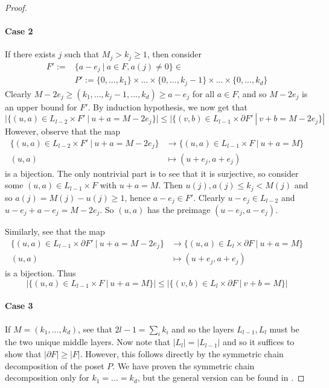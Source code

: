 \documentclass{scrartcl}
\theoremstyle{definition}
\begin{document}
\begin{proof}
    \paragraph{Case 2} If there exists $j$ such that $M_j > k_j \geq 1$, then consider
    \begin{align*}
        F' := &\{ a - e_j \ | \ a \in F, a(j) \neq 0 \} \in \\
        &P' := \{ 0, ..., k_1 \} \times ... \times \{ 0, ..., k_j - 1 \} \times ... \times \{ 0, ..., k_d \}
    \end{align*}
    Clearly $M - 2e_j \geq (k_1, ..., k_j - 1, ..., k_d) \geq a - e_j$ for all $a \in F$, and so $M - 2e_j$ is an upper bound for $F'$.
    By induction hypothesis, we now get that
    \begin{equation*}
        |\{ (u, a) \in L_{l - 2} \times F' \ | \ u + a = M - 2e_j \}| \leq |\{ (v, b) \in L_{l - 1} \times \partial F' \ | \ v + b = M - 2e_j \}|
    \end{equation*}
    However, observe that the map
    \begin{align*}
        \{ (u, a) \in L_{l - 2} \times F' \ | \ u + a = M - 2e_j \} &\to \{ (u, a) \in L_{l - 1} \times F \ | \ u + a = M \} \\
        (u, a) &\mapsto (u + e_j, a + e_j)
    \end{align*}
    is a bijection.
    The only nontrivial part is to see that it is surjective, so consider some $(u, a) \in L_{l - 1} \times F$ with $u + a = M$.
    Then $u(j), a(j) \leq k_j < M(j)$ and so $a(j) = M(j) - u(j) \geq 1$, hence $a - e_j \in F'$.
    Clearly $u - e_j \in L_{l - 2}$ and $u - e_j + a - e_j = M - 2e_j$.
    So $(u, a)$ has the preimage $(u - e_j, a - e_j)$.

    Similarly, see that the map
    \begin{align*}
        \{ (u, a) \in L_{l - 1} \times \partial F' \ | \ u + a = M - 2e_j \} &\to \{ (u, a) \in L_l \times \partial F \ | \ u + a = M \} \\
        (u, a) &\mapsto (u + e_j, a + e_j)
    \end{align*}
    is a bijection.
    Thus
    \begin{equation*}
        |\{ (u, a) \in L_{l - 1} \times F \ | \ u + a = M \}| \leq |\{ (v, b) \in L_l \times \partial F \ | \ v + b = M \}|
    \end{equation*}
    
    \paragraph{Case 3} If $M = (k_1, ..., k_d)$, see that $2l - 1 = \sum_i k_i$ and so the layers $L_{l - 1}, L_l$ must be the two unique middle layers.
    Now note that $|L_l| = |L_{l - 1}|$ and so it suffices to show that $|\partial F| \geq |F|$.
    However, this follows directly by the symmetric chain decomposition of the poset $P$.
    We have proven the symmetric chain decomposition only for $k_1 = ... = k_d$, but the general version can be found in \cite{anderson}.
\end{proof}
\end{document}
